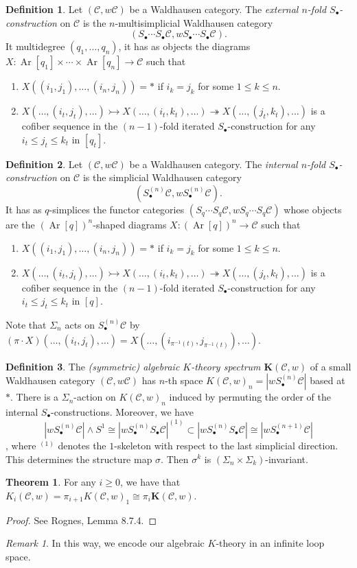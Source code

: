 \documentclass[10pt,letterpaper,cm]{nupset}
\theoremstyle{definition}
\newtheorem{definition}{Definition}
\theoremstyle{theorem}
\newtheorem{theorem}{Theorem}
\theoremstyle{remark}
\newtheorem{remark}{Remark}
\newcommand{\1}{\mathbf{1}}
\renewcommand{\c}{\mathscr{C}}
\newcommand{\0}{\vec 0}
\DeclareMathOperator{\Ar}{Ar}
\begin{document}
\begin{definition}
Let $(\c, w\c)$ be a Waldhausen category. The \textit{external $n$-fold $S_{\bullet}$-construction} on $\c$ is the $n$-multisimplicial Waldhausen category $$(S_{\bullet}\cdots S_{\bullet}\c, wS_{\bullet} \cdots S_{\bullet} \c).$$ It multidegree $(q_1, \ldots, q_n)$, it has as objects the diagrams  $X: \Ar[q_1] \times \cdots \times \Ar[q_n] \to \c$ such that
\begin{enumerate}
\item $X((i_1, j_1), \ldots, (i_n, j_n)) = \ast$ if $i_k = j_k$ for some $1\leq k \leq n$.
\item $X(\ldots, (i_t, j_t), \ldots) \rightarrowtail X(\ldots, (i_t, k_t), \ldots) \twoheadrightarrow X(\ldots, (j_t, k_t), \ldots)$ is a cofiber sequence  in the $(n-1)$-fold iterated $S_{\bullet}$-construction for any $i_t \leq j_t \leq k_t$ in $[q_t]$.
\end{enumerate}
\end{definition}

\begin{definition}
Let $(\c, w\c)$ be a Waldhausen category. The \textit{internal $n$-fold $S_{\bullet}$-construction} on $\c$ is the simplicial Waldhausen category $$(S_{\bullet}^{(n)}\c, wS_{\bullet}^{(n)} \c).$$ It has as $q$-simplices the functor categories $(S_q \cdots S_q \c, wS_q \cdots S_q \c)$ whose objects are the $(\Ar[q])^n$-shaped diagrams  $X: (\Ar[q])^n\to \c$ such that
\begin{enumerate}
\item $X((i_1, j_1), \ldots, (i_n, j_n)) = \ast$ if $i_k = j_k$ for some $1\leq k \leq n$.
\item $X(\ldots, (i_t, j_t), \ldots) \rightarrowtail X(\ldots, (i_t, k_t), \ldots) \twoheadrightarrow X(\ldots, (j_t, k_t), \ldots)$ is a cofiber sequence  in the $(n-1)$-fold iterated $S_{\bullet}$-construction for any $i_t \leq j_t \leq k_t$ in $[q]$.
\end{enumerate}
Note that $\Sigma_n$ acts on $S_{\bullet}^{(n)}\c$ by $(\pi \cdot X)(\ldots, (i_t, j_t), \ldots) = X(\ldots, (i_{\pi^{-1}(t)}, j_{\pi^{-1}(t)}), \ldots)$.
\end{definition}

\begin{definition}
The \textit{(symmetric) algebraic $K$-theory  spectrum $\mathbf{K}(\c, w)$} of a small Waldhausen category $(\c, w\c)$ has $n$-th space $K(\c, w)_n = |wS_{\bullet}^{(n)}\c|$ based at $\ast$. There is a $\Sigma_n$-action on $K(\c, w)_n$ induced by permuting the order of the internal $S_{\bullet}$-constructions. Moreover, we have $$|wS_{\bullet}^{(n)}\c| \land S^1 \cong |wS_{\bullet}^{(n)}S_{\bullet}\c|^{(1)} \subset |wS_{\bullet}^{(n)}S_{\bullet}\c| \cong |wS_{\bullet}^{(n+1)}\c|$$, where $^{(1)}$ denotes the $1$-skeleton with respect to the last simplicial direction. This determines the structure map $\sigma$. Then $\sigma^k$ is $(\Sigma_{n} \times \Sigma_{k})$-invariant.
\end{definition}


\begin{theorem}
For any $i\geq 0$, we have that $K_i(\c, w) = \pi_{i+1}K(\c, w)_1 \cong \pi_i \mathbf{K}(\c, w)$.
\end{theorem}
\begin{proof}
See Rognes, Lemma 8.7.4.
\end{proof}

\begin{remark}
In this way, we encode our algebraic $K$-theory in an infinite loop space.
\end{remark}
\end{document}
